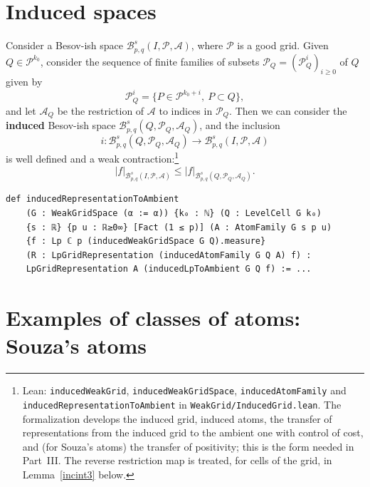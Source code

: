 \documentclass[11pt]{amsart}
\theoremstyle{definition}
\newcommand{\lean}[1]{\texttt{#1}}
\begin{document}
\section{Induced spaces}\label{inducedsec}

Consider a Besov-ish space $\mathcal{B}^s_{p,q}(I,\mathcal{P},\mathcal{A})$,
where $\mathcal{P}$ is a good grid. Given $Q\in \mathcal{P}^{k_0}$, consider
the sequence of finite families of subsets
$\mathcal{P}_Q=(\mathcal{P}_Q^i)_{i\geq 0}$ of $Q$ given by
$$\mathcal{P}^i_Q=\{ P\in \mathcal{P}^{k_0+i},\ P\subset Q\},$$
and let $\mathcal{A}_Q$ be the restriction of $\mathcal{A}$ to indices in
$\mathcal{P}_Q$. Then we can consider the {\bf induced} Besov-ish space
$\mathcal{B}^s_{p,q}(Q,\mathcal{P}_Q,\mathcal{A}_Q)$, and the inclusion
$$i\colon \mathcal{B}^s_{p,q}(Q,\mathcal{P}_Q,\mathcal{A}_Q) \rightarrow \mathcal{B}^s_{p,q}(I,\mathcal{P},\mathcal{A})$$
is well defined and a weak contraction:\footnote{Lean: \lean{inducedWeakGrid}, \lean{inducedWeakGridSpace},
\lean{inducedAtomFamily} and \lean{inducedRepresentationToAmbient} in
\lean{WeakGrid/InducedGrid.lean}. The formalization develops the induced
grid, induced atoms, the transfer of representations from the induced grid to
the ambient one with control of cost, and (for Souza's atoms) the transfer of
positivity; this is the form needed in Part~III. The reverse restriction map
is treated, for cells of the grid, in Lemma~\ref{incint3} below.}
$$|f|_{\mathcal{B}^s_{p,q}(I,\mathcal{P},\mathcal{A})}\leq
|f|_{\mathcal{B}^s_{p,q}(Q,\mathcal{P}_Q,\mathcal{A}_Q)}.$$
\begin{lstlisting}[style=lean]
def inducedRepresentationToAmbient
    (G : WeakGridSpace (α := α)) {k₀ : ℕ} (Q : LevelCell G k₀)
    {s : ℝ} {p u : ℝ≥0∞} [Fact (1 ≤ p)] (A : AtomFamily G s p u)
    {f : Lp ℂ p (inducedWeakGridSpace G Q).measure}
    (R : LpGridRepresentation (inducedAtomFamily G Q A) f) :
    LpGridRepresentation A (inducedLpToAmbient G Q f) := ...
\end{lstlisting}

\section{Examples of classes of atoms: Souza's atoms}\label{secatom}
\end{document}
